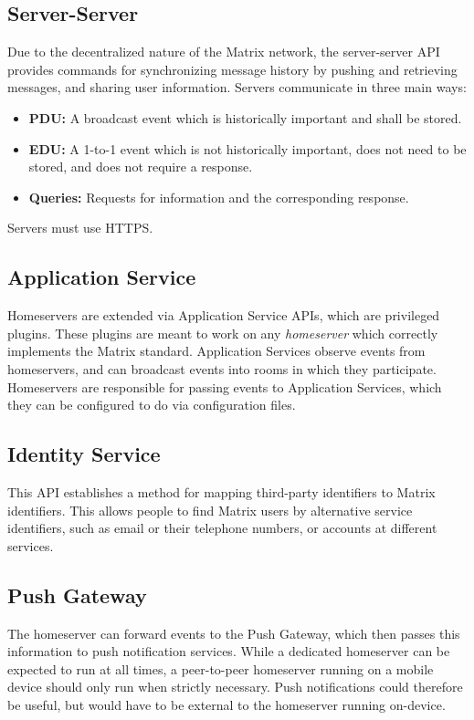 \subsection{Server-Server}
Due to the decentralized nature of the Matrix network, the server-server \ac{API} provides commands for synchronizing message history by pushing and retrieving messages, and sharing user information.
Servers communicate in three main ways:
\begin{itemize}
    \item{
        \textbf{\ac{PDU}:} 
        A broadcast event which is historically important and shall be stored.
    }
    \item{
        \textbf{\ac{EDU}:}
        A 1-to-1 event which is not historically important, does not need to be stored, and does not require a response.
    }
    \item{
        \textbf{Queries:}
        Requests for information and the corresponding response.
    }
\end{itemize}
Servers must use \ac{HTTPS}.

\subsection{Application Service}
Homeservers are extended via Application Service \ac{API}s, which are privileged plugins.
These plugins are meant to work on any \textit{homeserver} which correctly implements the Matrix standard.
Application Services observe events from homeservers, and can broadcast events into rooms in which they participate.
Homeservers are responsible for passing events to Application Services, which they can be configured to do via configuration files.

\subsection{Identity Service}
This \ac{API} establishes a method for mapping third-party identifiers to Matrix identifiers.
This allows people to find Matrix users by alternative service identifiers, such as email or their telephone numbers, or accounts at different services.

\subsection{Push Gateway}
The homeserver can forward events to the Push Gateway, which then passes this information to push notification services.
While a dedicated homeserver can be expected to run at all times, a peer-to-peer homeserver running on a mobile device should only run when strictly necessary.
Push notifications could therefore be useful, but would have to be external to the homeserver running on-device.


